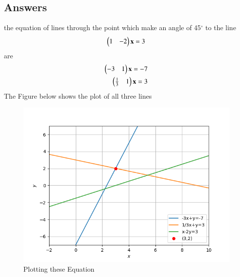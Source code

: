 \documentclass[journal,12pt,twocolumn]{IEEEtran}
\begin{document}
\subsection{Answers}
the equation of lines through the point   which make an angle of 45$^{\circ}$ to the line
\begin{align}
\begin{pmatrix}1 & -2\end{pmatrix}\mathbf{x} = 3 
\end{align}
are
\begin{align}
   \begin{pmatrix}-3 & 1\end{pmatrix}\mathbf{x}=-7\\ 
   \begin{pmatrix}\frac{1}{3} & 1\end{pmatrix}\mathbf{x}=3
\end{align}
The Figure below shows the plot of all three lines
\begin{figure}[!ht]
\centering
\includegraphics[width=\columnwidth]{Edit_plot.png}
\caption{Plotting these Equation}
\end{figure}
\end{document}

